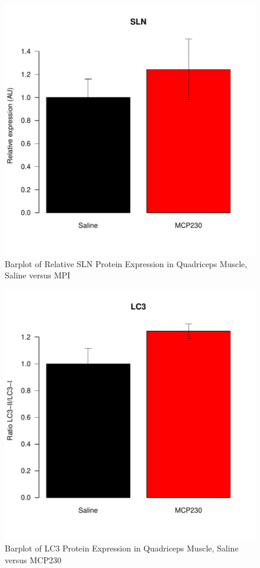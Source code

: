 \documentclass{article}
\begin{document}
\begin{figure}
\begin{center}
\includegraphics{2016-01-21_MitochondrialProteins-barplotSLN}
\end{center}
\caption{Barplot of Relative SLN Protein Expression in Quadriceps Muscle, Saline versus MPI}
\label{fig:barplotSLN}
\end{figure}

\begin{figure}
\begin{center}
\includegraphics{2016-01-21_MitochondrialProteins-barplotLC3}
\end{center}
\caption{Barplot of LC3 Protein Expression in Quadriceps Muscle, Saline versus MCP230}
\label{fig:barplotLC3}
\end{figure}
\end{document}
